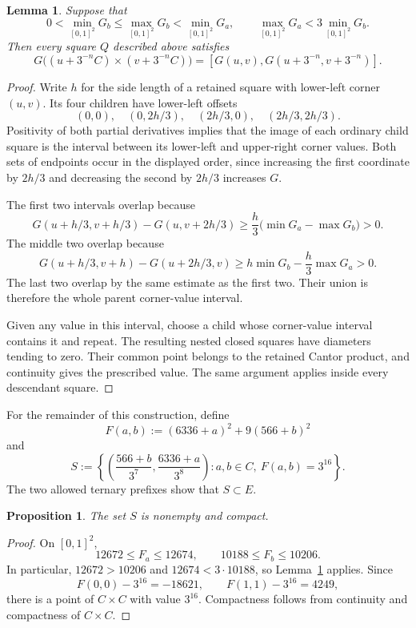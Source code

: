 \documentclass[11pt,a4paper]{amsart}
\numberwithin{equation}{section}
\newtheorem{lemma}[theorem]{Lemma}
\newtheorem{proposition}[theorem]{Proposition}
\theoremstyle{definition}
\begin{document}
\begin{lemma}\label{lem:interval-cover}
Suppose that
\[
0<\min_{[0,1]^2}G_b
\leq\max_{[0,1]^2}G_b
<\min_{[0,1]^2}G_a,
\qquad
\max_{[0,1]^2}G_a<3\min_{[0,1]^2}G_b.
\]
Then every square \(Q\) described above satisfies
\[
G\bigl((u+3^{-n}C)\times(v+3^{-n}C)\bigr)
=[G(u,v),G(u+3^{-n},v+3^{-n})].
\]
\end{lemma}

\begin{proof}
Write \(h\) for the side length of a retained square with lower-left
corner \((u,v)\). Its four children have lower-left offsets
\[
(0,0),\quad(0,2h/3),\quad(2h/3,0),\quad(2h/3,2h/3).
\]
Positivity of both partial derivatives implies that the image of each
ordinary child square is the interval between its lower-left and
upper-right corner values. Both sets of endpoints occur in the
displayed order, since increasing the first coordinate by \(2h/3\)
and decreasing the second by \(2h/3\) increases \(G\).

The first two intervals overlap because
\[
G(u+h/3,v+h/3)-G(u,v+2h/3)
\geq\frac h3\bigl(\min G_a-\max G_b\bigr)>0.
\]
The middle two overlap because
\[
G(u+h/3,v+h)-G(u+2h/3,v)
\geq h\min G_b-\frac h3\max G_a>0.
\]
The last two overlap by the same estimate as the first two.
Their union is therefore the whole parent corner-value interval.

Given any value in this interval, choose a child whose corner-value
interval contains it and repeat. The resulting nested closed squares
have diameters tending to zero. Their common point belongs to the
retained Cantor product, and continuity gives the prescribed value.
The same argument applies inside every descendant square.
\end{proof}

For the remainder of this construction, define
\[
F(a,b):=(6336+a)^2+9(566+b)^2
\]
and
\[
S:=\left\{\left(\frac{566+b}{3^7},\frac{6336+a}{3^8}\right):
                       a,b\in C,\ F(a,b)=3^{16}\right\}.
\]
The two allowed ternary prefixes show that \(S\subset E\).

\begin{proposition}\label{prop:source}
The set \(S\) is nonempty and compact.
\end{proposition}

\begin{proof}
On \([0,1]^2\),
\[
12672\leq F_a\leq12674,\qquad
10188\leq F_b\leq10206.
\]
In particular, \(12672>10206\) and \(12674<3\cdot10188\), so
Lemma~\ref{lem:interval-cover} applies. Since
\[
F(0,0)-3^{16}=-18621,\qquad
F(1,1)-3^{16}=4249,
\]
there is a point of \(C\times C\) with value \(3^{16}\).
Compactness follows from continuity and compactness of \(C\times C\).
\end{proof}
\end{document}
